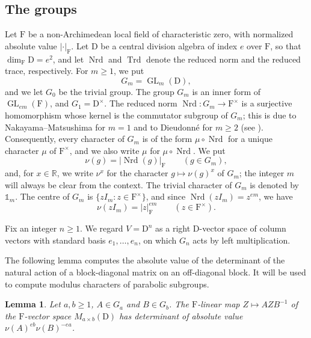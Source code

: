 \documentclass[11pt]{amsart}
\numberwithin{equation}{section}
\theoremstyle{plain}
\newtheorem{lemma}[theorem]{Lemma}
\theoremstyle{definition}
\theoremstyle{remark}
\newcommand{\R}{\mathbb{R}}
\newcommand{\one}{\mathds{1}}
\DeclareMathOperator{\GL}{GL}
\DeclareMathOperator{\Nrd}{Nrd}
\DeclareMathOperator{\Trd}{Trd}
\begin{document}
\subsection{The groups}\label{ss:groups}

Let $\mathrm{F}$ be a non-Archimedean local field of characteristic zero, with normalized absolute value $|\cdot|_{\mathrm{F}}$. Let $\mathrm{D}$ be a central division algebra of index $e$ over $\mathrm{F}$, so that $\dim_{\mathrm{F}}\mathrm{D}=e^2$, and let $\Nrd$ and $\Trd$ denote the reduced norm and the reduced trace, respectively. For $m\ge 1$, we put
$$
G_m=\GL_m(\mathrm{D}),
$$
and we let $G_0$ be the trivial group. The group $G_m$ is an inner form of $\GL_{em}(\mathrm{F})$, and $G_1=\mathrm{D}^\times$. The reduced norm $\Nrd\colon G_m\to \mathrm{F}^\times$ is a surjective homomorphism whose kernel is the commutator subgroup of $G_m$; this is due to Nakayama--Matsushima for $m=1$ and to Dieudonn\'e for $m\ge2$ (see \cite{Dra83,PR94}). Consequently, every character of $G_m$ is of the form $\mu\circ\Nrd$ for a unique character $\mu$ of $\mathrm{F}^\times$, and we also write $\mu$ for $\mu\circ\Nrd$. We put
$$
\nu(g)=|\Nrd(g)|_{\mathrm{F}}\qquad (g\in G_m),
$$
and, for $x\in\R$, we write $\nu^x$ for the character $g\mapsto \nu(g)^x$ of $G_m$; the integer $m$ will always be clear from the context. The trivial character of $G_m$ is denoted by $\one_m$. The centre of $G_m$ is $\{zI_m:z\in \mathrm{F}^\times\}$, and since $\Nrd(zI_m)=z^{em}$, we have
\begin{equation}\label{eq:nu-centre}
	\nu(zI_m)=|z|_{\mathrm{F}}^{em}\qquad(z\in \mathrm{F}^\times).
\end{equation}

Fix an integer $n\ge1$. We regard $V=\mathrm{D}^n$ as a right $\mathrm{D}$-vector space of column vectors with standard basis $e_1,\dots,e_n$, on which $G_n$ acts by left multiplication.

The following lemma computes the absolute value of the determinant of the natural action of a block-diagonal matrix on an off-diagonal block. It will be used to compute modulus characters of parabolic subgroups.

\begin{lemma}\label{lem:det}
	Let $a,b\ge1$, $A\in G_a$ and $B\in G_b$. The $\mathrm{F}$-linear map $Z\mapsto AZB^{-1}$ of the $\mathrm{F}$-vector space $M_{a\times b}(\mathrm{D})$ has determinant of absolute value $\nu(A)^{eb}\nu(B)^{-ea}$.
\end{lemma}
\end{document}
